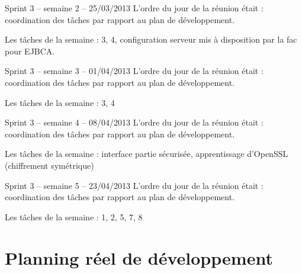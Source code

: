 \documentclass[a4paper,11pt,french]{article}
\begin{document}
\begin{paragraph}{Sprint 3 -- semaine 2 -- 25/03/2013}
L’ordre du jour de la réunion était : coordination des tâches par rapport au plan de développement.

Les tâches de la semaine : 3, 4, configuration serveur mis à disposition par la fac pour EJBCA.
\end{paragraph}

\begin{paragraph}{Sprint 3 -- semaine 3 -- 01/04/2013}
L’ordre du jour de la réunion était : coordination des tâches par rapport au plan de développement.

Les tâches de la semaine : 3, 4
\end{paragraph}

\begin{paragraph}{Sprint 3 -- semaine 4 -- 08/04/2013}
L’ordre du jour de la réunion était : coordination des tâches par rapport au plan de développement.

Les tâches de la semaine : interface partie sécurisée, apprentissage d'OpenSSL (chiffrement symétrique)
\end{paragraph}

\begin{paragraph}{Sprint 3 -- semaine 5 -- 23/04/2013}
L’ordre du jour de la réunion était : coordination des tâches par rapport au plan de développement.

Les tâches de la semaine : 1, 2, 5, 7, 8
\end{paragraph}

\section{Planning réel de développement}
\end{document}
